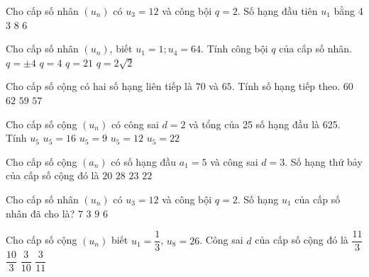 \begin{ex}
Cho cấp số nhân $(u_n)$ có $u_3=12$ và công bội $q=2$. Số hạng đầu tiên $u_1$ bằng
\choice
{4}
{\True $3$}
{8}
{6}
\end{ex}
\begin{ex}
Cho cấp số nhân $(u_n)$, biết $u_1=1;u_4=64$. Tính công bội $q$ của cấp số nhân.
\choice
{$q=\pm 4$}
{\True $q=4$}
{$q=21$}
{$q=2\sqrt{2}$}
\end{ex}
\begin{ex}
Cho cấp số cộng có hai số hạng liên tiếp là $70$ và $65$. Tính số hạng tiếp theo.
\choice
{\True $60$}
{$62$}
{$59$}
{$57$}
\end{ex}
\begin{ex}
Cho cấp số cộng $(u_n)$ có công sai $d=2$ và tổng của 25 số hạng đầu là 625. Tính $u_5$
\choice
{$u_5=16$}
{\True $u_5=9$}
{$u_5=12$}
{$u_5=22$}
\end{ex}
\begin{ex}
    Cho cấp số cộng $(a_n)$ có số hạng đầu $a_1=5$ và công sai $d=3$. Số hạng thứ bảy của cấp số cộng đó là
\choice
{$20$}
{$28$}
{\True $23$}
{$22$}
\end{ex}
\begin{ex}
Cho cấp số nhân $(u_n)$ có $u_3=12$ và công bội $q=2$. Số hạng $u_1$ của cấp số nhân đã cho là?
\choice
{$7$}
{\True $3$}
{$9$}
{$6$}
\end{ex}
\begin{ex}
Cho cấp số cộng $(u_n)$ biết $u_1=\dfrac{1}{3}$, $u_8=26$. Công sai $d$ của cấp số cộng đó là 
\choice
{\True $\dfrac{11}{3}$}
{$\dfrac{10}{3}$}
{$\dfrac{3}{10}$}
{$\dfrac{3}{11}$}
\end{ex}
